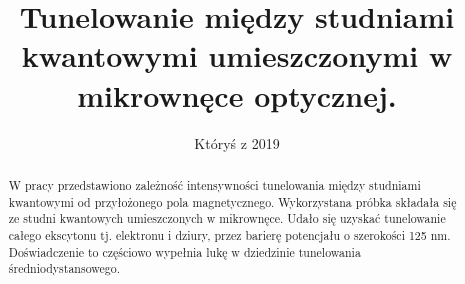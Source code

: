 \documentclass[licencjacka]{pracamgr}
\title{Tunelowanie między studniami kwantowymi umieszczonymi w mikrownęce optycznej.}
\date{Któryś z 2019}
\begin{document}
\maketitle

\begin{abstract}
  W pracy przedstawiono zależność intensywności tunelowania między studniami kwantowymi od przyłożonego pola magnetycznego. Wykorzystana próbka składała się ze studni kwantowych umieszczonych w mikrownęce. Udało się uzyskać tunelowanie całego ekscytonu tj. elektronu i dziury, przez barierę potencjału o szerokości 125 nm. Doświadczenie to częściowo wypełnia lukę w dziedzinie tunelowania średniodystansowego.
\end{abstract}

\tableofcontents
\end{document}

